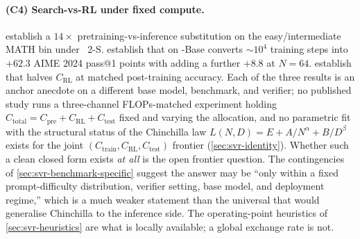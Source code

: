 \paragraph{(C4) Search-vs-RL under fixed compute.}
 establish a $14\times$ pretraining-vs-inference
substitution on the easy/intermediate MATH bin under ~2-S\*.
 establish that  on -Base
converts ${\sim}10^{4}$ training steps into $+62.3$ AIME 2024 pass@1
points with  adding a further $+8.8$ at $N\!=\!64$.
 establish that  halves $C_\text{RL}$ at
matched post-training accuracy. Each of the three results is an anchor
anecdote on a different base model, benchmark, and verifier; no
published study runs a three-channel FLOPs-matched experiment holding
$C_\text{total} = C_\text{pre} + C_\text{RL} + C_\text{test}$ fixed
and varying the allocation, and no parametric fit with the structural
status of the Chinchilla law $L(N, D) = E + A/N^\alpha + B/D^\beta$
exists for the joint $(C_\text{train}, C_\text{RL}, C_\text{test})$
frontier (\cref{sec:svr-identity}). Whether such a clean closed form
exists \emph{at all} is the open frontier question. The contingencies
of \cref{sec:svr-benchmark-specific} suggest the answer may be ``only
within a fixed prompt-difficulty distribution, verifier setting, base
model, and deployment regime,'' which is a much weaker statement than
the universal  that would generalise Chinchilla to the
inference side. The operating-point heuristics of
\cref{sec:svr-heuristics} are what is locally available; a global
exchange rate is not.

